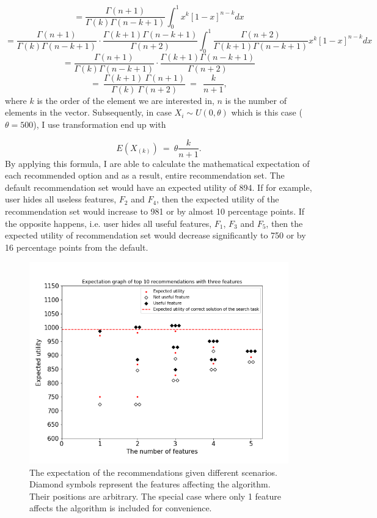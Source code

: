 \documentclass[a4paper,12pt]{article}
\begin{document}
$$
=\frac{\Gamma\left(n+1\right)}{\Gamma\left(k\right)\Gamma\left(n-k+1\right)}\int_{0}^{1}{x^k\left[1-x\right]^{n-k}}dx
$$
$$
=\frac{\Gamma\left(n+1\right)}{\Gamma\left(k\right)\Gamma\left(n-k+1\right)}\cdot\frac{\Gamma\left(k+1\right)\Gamma\left(n-k+1\right)}{\Gamma\left(n+2\right)}\int_{0}^{1}\frac{\Gamma\left(n+2\right)}{\Gamma\left(k+1\right)\Gamma\left(n-k+1\right)}x^k\left[1-x\right]^{n-k}dx
$$
$$
=\frac{\Gamma\left(n+1\right)}{\Gamma\left(k\right)\Gamma\left(n-k+1\right)}\cdot\frac{\Gamma\left(k+1\right)\Gamma\left(n-k+1\right)}{\Gamma\left(n+2\right)}
$$
$$
=\ \frac{\Gamma\left(k+1\right)\ \Gamma\left(n+1\right)}{\Gamma\left(k\right)\ \Gamma\left(n+2\right)}\ =\ \ \frac{k}{n+1} ,
$$
where $k$ is the order of the element we are interested in, $n$ is the number of elements in the vector. Subsequently, in case $X_i\sim U\left(0,\theta\right)$ which is this case ($\theta = 500$), I use transformation end up with 

$$
E\left(X_{\left(k\right)}\right)\ =\ \theta\frac{k}{n+1} .
$$
By applying this formula, I are able to calculate the mathematical expectation of each recommended option and as a result, entire recommendation set. The default recommendation set would have an expected utility of 894. If for example, user hides all useless features, $F_2$ and $F_4$, then the expected utility of the recommendation set would increase to 981 or by almost 10 percentage points. If the opposite happens, i.e. user hides all useful features, $F_1$, $F_3$ and $F_5$, then the expected utility of recommendation set would decrease significantly to 750 or by 16 percentage points from the default.

\begin{figure}
    \centering
    \includegraphics[width=0.8\linewidth]{staticFiles/ThreeFeaturesExpectationTop10SUMutility.png}
    \caption[The expectation of the recommendations]{The expectation of the recommendations given different scenarios. Diamond symbols represent the features affecting the algorithm. Their positions are arbitrary. The special case where only 1 feature affects the algorithm is included for convenience.}
    \label{fig:expectationGraph}
\end{figure}
\end{document}

